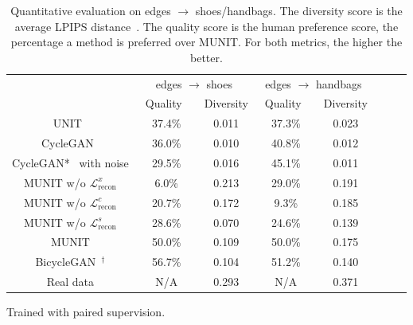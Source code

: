 \documentclass[runningheads]{llncs}
\begin{document}
	
	\begin{table}[!tb]
		\addtolength{\tabcolsep}{8pt}
		\renewcommand\arraystretch{1.3}
		\centering
		\small
		\begin{threeparttable}
			\caption{Quantitative evaluation on edges $\rightarrow$ shoes/handbags. The diversity score is the average LPIPS distance~\cite{zhang2018unreasonable}. The quality score is the human preference score, the percentage a method is preferred over MUNIT. For both metrics, the higher the better.\label{tab:edges}}
\begin{tabular}{|c|c|c|c|c|c|c|c|}
				\hline
				& \multicolumn{2}{c|}{edges $\rightarrow$ shoes} & \multicolumn{2}{c|}{edges $\rightarrow$ handbags} \\  \cline{2-5}
				& \ Quality\ \  & Diversity &  \ Quality\ \  & Diversity \\ 
				\hline
				UNIT~\cite{liu2017unsupervised} & 37.4\% & 0.011 & 37.3\%  & 0.023 \\
				CycleGAN~\cite{zhu2017unpaired} & 36.0\% & 0.010 & 40.8\% & 0.012 \\
				CycleGAN*~\cite{zhu2017unpaired} with noise & 29.5\% & 0.016 & 45.1\% & 0.011 \\
				\hline
				MUNIT w/o $\mathcal{L}^{x}_{\text{recon}}$ & 6.0\% & 0.213 & 29.0\% & 0.191 \\
				MUNIT w/o $\mathcal{L}^{c}_{\text{recon}}$ & 20.7\% & 0.172 & 9.3\% & 0.185\\
				MUNIT w/o $\mathcal{L}^{s}_{\text{recon}}$ & 28.6\% & 0.070 & 24.6\% & 0.139 \\
				MUNIT  & 50.0\% & 0.109 & 50.0\% & 0.175 \\
				\hline
				BicycleGAN~\cite{zhu2017toward}$^\dag$ & 56.7\%  & 0.104 & 51.2\% & 0.140 \\
				\hline
				Real data & N/A & 0.293 & N/A & 0.371 \\
				\hline
			\end{tabular}
			\begin{tablenotes}
				\item [\dag] Trained with paired supervision.
\end{tablenotes}
\end{threeparttable}
	\end{table}
	
\end{document}
